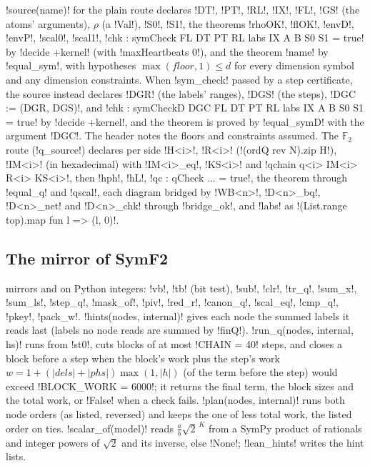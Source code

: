 \py!source(name)! for the plain route declares \lean!DT!, \lean!PT!, \lean!RL!, \lean!IX!, \lean!FL!, \lean!GS! (the atoms' arguments), $\rho$ (a \lean!Val!), \lean!S0!, \lean!S1!, the theorems \lean!rhoOK!, \lean!flOK!, \lean!envD!, \lean!envP!, \lean!scal0!, \lean!scal1!, \lean!chk : symCheck FL DT PT RL labs IX A B S0 S1 = true! by \lean!decide +kernel! (with \lean!maxHeartbeats 0!), and the theorem \lean!name! by \lean!equal_sym!, with hypotheses $\max(\mathit{floor},1)\le d$ for every dimension symbol and any dimension constraints. When \py!sym_check! passed by a step certificate, the source instead declares \lean!DGR! (the labels' ranges), \lean!DGS! (the steps), \lean!DGC := (DGR, DGS)!, and \lean!chk : symCheckD DGC FL DT PT RL labs IX A B S0 S1 = true! by \lean!decide +kernel!, and the theorem is proved by \lean!equal_symD! with the argument \lean!DGC!. The header notes the floors and constraints assumed. The $\mathbb{F}_2$ route (\py!q_source!) declares per side \lean!H<i>!, \lean!R<i>! (\lean!(ordQ rev N).zip H!), \lean!IM<i>! (in hexadecimal) with \lean!IM<i>_eq!, \lean!KS<i>! and \lean!qchain q<i> IM<i> R<i> KS<i>!, then \lean!hph!, \lean!hL!, \lean!qc : qCheck ... = true!, the theorem through \lean!equal_q! and \lean!qscal!, each diagram bridged by \lean!WB<n>!, \lean!D<n>_bq!, \lean!D<n>_net! and \lean!D<n>_chk! through \lean!bridge_ok!, and \lean!labs! as \lean!(List.range top).map fun l => (l, 0)!.

\subsection{The mirror of SymF2}

 mirrors  and  on Python integers: \py!vb!, \py!tb! (bit test), \py!sub!, \py!clr!, \py!tr_q!, \py!sum_x!, \py!sum_ls!, \py!step_q!, \py!mask_of!, \py!piv!, \py!red_r!, \py!canon_q!, \py!scal_eq!, \py!cmp_q!, \py!pkey!, \py!pack_w!. \py!hints(nodes, internal)! gives each node the summed labels it reads last (labels no node reads are summed by \lean!finQ!). \py!run_q(nodes, internal, hs)! runs from \lean!st0!, cuts blocks of at most \py!CHAIN = 40! steps, and closes a block before a step when the block's work plus the step's work $w=1+(|\mathit{dels}|+|\mathit{phs}|)\max(1,|h|)$ (of the term before the step) would exceed \py!BLOCK_WORK = 6000!; it returns the final term, the block sizes and the total work, or \py!False! when a check fails. \py!plan(nodes, internal)! runs both node orders (as listed, reversed) and keeps the one of less total work, the listed order on ties. \py!scalar_of(model)! reads $\frac ab\sqrt2^{\,K}$ from a SymPy product of rationals and integer powers of $\sqrt2$ and its inverse, else \py!None!; \py!lean_hints! writes the hint lists.
